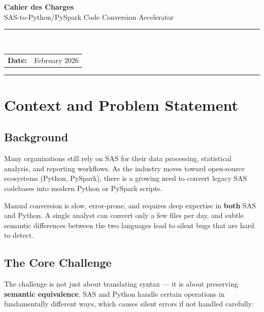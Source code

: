 \documentclass[11pt,a4paper]{article}
\begin{document}
\begin{titlepage}
\centering
\vspace*{2cm}

{\Huge\bfseries\textcolor{primary}{Cahier des Charges}\\[0.5cm]}
{\LARGE\textcolor{accent}{SAS-to-Python/PySpark Code Conversion Accelerator}\\[1.5cm]}

\textcolor{accent}{\rule{0.6\textwidth}{1.2pt}}\\[1.5cm]

\begin{tabular}{rl}
    \textbf{Date:} & February 2026 \\
\end{tabular}

\vfill
\textcolor{accent}{\rule{0.6\textwidth}{0.4pt}}
\end{titlepage}

\tableofcontents
\newpage

\section{Context and Problem Statement}

\subsection{Background}

Many organizations still rely on SAS for their data processing, statistical analysis, and reporting workflows. As the industry moves toward open-source ecosystems (Python, PySpark), there is a growing need to convert legacy SAS codebases into modern Python or PySpark scripts.

Manual conversion is slow, error-prone, and requires deep expertise in \textbf{both} SAS and Python. A single analyst can convert only a few files per day, and subtle semantic differences between the two languages lead to silent bugs that are hard to detect.

\subsection{The Core Challenge}

The challenge is not just about translating syntax — it is about preserving \textbf{semantic equivalence}. SAS and Python handle certain operations in fundamentally different ways, which causes silent errors if not handled carefully:
\end{document}
